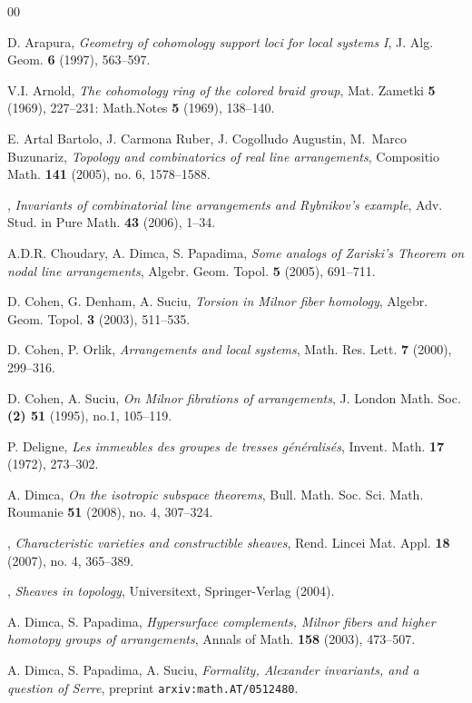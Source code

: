 \documentclass[psamsfonts]{conm-p-l}
\theoremstyle{definition}
\theoremstyle{remark}
\numberwithin{equation}{section}
\begin{document}
\begin{thebibliography}{00}

 D. Arapura,
\textit{ Geometry of cohomology support loci for local systems I},
J. Alg. Geom. \textbf{6} (1997), 563--597.

 V.I. Arnold,
\textit{ The cohomology ring of the colored braid group},
Mat. Zametki  \textbf{5} (1969), 227--231: Math.Notes  \textbf{5} (1969), 138--140.

 E.  Artal Bartolo, J. Carmona Ruber, J. Cogolludo Augustin, M.~Marco Buzunariz,
\textit{ Topology and combinatorics of real line arrangements}, Compositio Math. \textbf{141} (2005), no. 6, 1578--1588.

 \bysame,
\textit{ Invariants of combinatorial line arrangements and Rybnikov's example}, Adv. Stud. in Pure Math. \textbf{43} (2006), 1--34.

 A.D.R. Choudary, A. Dimca, S. Papadima,
\textit{ Some analogs of Zariski's Theorem on nodal line arrangements},
Algebr. Geom. Topol. \textbf{5} (2005), 691--711.

 D. Cohen, G. Denham, A. Suciu,
\textit{ Torsion in Milnor fiber homology},
Algebr. Geom. Topol. \textbf{3} (2003), 511--535.

 D. Cohen, P. Orlik,
\textit{ Arrangements and local systems},
Math. Res. Lett. \textbf{7} (2000), 299--316.

 D. Cohen, A. Suciu,
{\em On Milnor fibrations of arrangements},
J. London Math. Soc. \textbf{(2) 51} (1995), no.1, 105--119.

 P. Deligne,
\textit{ Les immeubles des groupes de tresses g\'{e}n\'{e}ralis\'{e}s},
Invent. Math. \textbf{17} (1972), 273--302.

 A. Dimca,
\textit{ On the isotropic subspace theorems}, Bull. Math. Soc. Sci. Math. Roumanie \textbf{51} (2008), no. 4, 307--324.

 \bysame,
\textit{ Characteristic varieties and constructible sheaves}, Rend. Lincei Mat. Appl. \textbf{18} (2007), no. 4, 365--389.

 \bysame,
\textit{ Sheaves in topology}, Universitext, Springer-Verlag (2004).

 A. Dimca, S. Papadima,
\textit{ Hypersurface complements, Milnor fibers and higher 
homotopy groups of arrangements}, Annals of Math. \textbf{158} (2003), 473--507.

 A. Dimca, S. Papadima, A. Suciu,
\textit{ Formality, {A}lexander invariants, and a question 
of {S}erre}, preprint {\tt arxiv:math.AT/0512480}.


\end{thebibliography}
\end{document}

